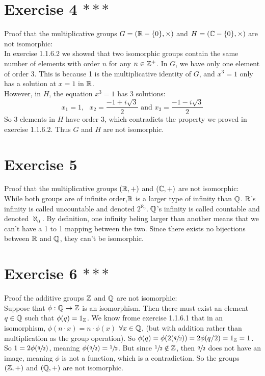 \documentclass[12pt]{article}
\begin{document}
    \section*{Exercise 4 $***$}
    Proof that the multiplicative groups $G = (\mathbb{R} - \{0\}, \times)$
    and $H = (\mathbb{C} - \{0\}, \times)$ are not isomorphic: \\
    In exercise 1.1.6.2 we showed that two isomorphic groups contain the same
    number of elements with order $n$ for any $n \in \mathbb{Z}^+$.
    In $G$, we have only one element of order 3.
    This is because 1 is the multiplicative identity of $G$,
    and $x^3 = 1$ only has a solution at $x = 1$ in $\mathbb{R}$. \\
    However, in $H$, the equation $x^3 = 1$ has 3 solutions:
    \[x_1 = 1, \text{ } x_2 = \dfrac{-1 + i\sqrt{3}}{2}
    \text{ and } x_3 = \dfrac{-1 - i\sqrt{3}}{2}\]
    So 3 elements in $H$ have order 3,
    which contradicts the property we proved in exercise 1.1.6.2.
    Thus $G$ and $H$ are not isomorphic. 
    

    \section*{Exercise 5}
    Proof that the multiplicative groups $(\mathbb{R}, +)$
    and $(\mathbb{C}, +)$ are not isomorphic: \\
    While both groups are of infinite order,$
    \mathbb{R}$ is a larger type of infinity than $\mathbb{Q}$.
    $\mathbb{R}$'s infinity is called uncountable and denoted $2^{\aleph_0}$.
    $\mathbb{Q}$'s infinity is called countable and denoted $\aleph_0$.
    By definition, one infinity beling larger than another means that
    we can't have a 1 to 1 mapping between the two.
    Since there exists no bijections between $\mathbb{R}$ and $\mathbb{Q}$,
    they can't be isomorphic.


    \section*{Exercise 6 $***$}
    Proof the additive groups $\mathbb{Z}$ and $\mathbb{Q}$ are not isomorphic: \\
    Suppose that $\phi: \mathbb{Q} \to \mathbb{Z}$ is an isomorphism.
    Then there must exist an element $q \in \mathbb{Q}$
    such that $\phi(q) = 1_{\mathbb{Z}}$.
    We know frome exercise 1.1.6.1 that in an isomorphism,
    $\phi(n \cdot x) = n \cdot \phi(x)$ $\forall x \in \mathbb{Q}$,
    (but with addition rather than multiplication as the group operation).
    So $\phi(q) = \phi(2(\sfrac{q}{2})) = 2\phi(q/2) = 1_{\mathbb{Z}} = 1$.
    So $1 = 2\phi(\sfrac{q}{2})$, meaning $\phi(\sfrac{q}{2}) = \sfrac{1}{2}$.
    But since $\sfrac{1}{2} \notin \mathbb{Z}$,
    then $\sfrac{q}{2}$ does not have an image,
    meaning $\phi$ is not a function, which is a contradiction.
    So the groups $(\mathbb{Z}, +)$ and $(\mathbb{Q}, +)$ are not isomorphic.
\end{document}
